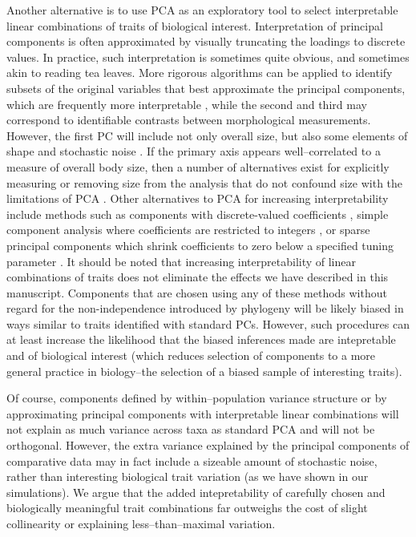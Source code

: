 \documentclass[a4paper,12pt]{article}
\begin{document}
Another alternative is to use PCA as an exploratory tool to select interpretable linear combinations of traits of biological interest. Interpretation of principal components is often approximated by visually truncating the loadings to discrete values. In practice, such interpretation is sometimes quite obvious, and sometimes akin to reading tea leaves. More rigorous algorithms can be applied to identify subsets of the original variables that best approximate the principal components, which are frequently more interpretable \citep{Cadima2001}, while the second and third may correspond to identifiable contrasts between morphological measurements. However, the first PC will include not only overall size, but also some elements of shape and stochastic noise \citep{Somers1986, Somers1989}. If the primary axis appears well--correlated to a measure of overall body size, then a number of alternatives exist for explicitly measuring or removing size from the analysis that do not confound size with the limitations of PCA \citep{Somers1989}. Other alternatives to PCA for increasing interpretability include methods such as components with discrete-valued coefficients \citep{Hausman1982}, simple component analysis where coefficients are restricted to integers \citep{Vines2000}, or sparse principal components which shrink coefficients to zero below a specified tuning parameter \citep{Jolliffe2002, Zou2006}. It should be noted that increasing interpretability of linear combinations of traits does not eliminate the effects we have described in this manuscript. Components that are chosen using any of these methods without regard for the non-independence introduced by phylogeny will be likely biased in ways similar to traits identified with standard PCs. However, such procedures can at least increase the likelihood that the biased inferences made are intepretable and of biological interest (which reduces selection of components to a more general practice in biology--the selection of a biased sample of interesting traits).  

Of course, components defined by within--population variance structure or by approximating principal components with interpretable linear combinations will not explain as much variance across taxa as standard PCA and will not be orthogonal. However, the extra variance explained by the principal components of comparative data may in fact include a sizeable amount of stochastic noise, rather than interesting biological trait variation (as we have shown in our simulations). We argue that the added intepretability of carefully chosen and biologically meaningful trait combinations far outweighs the cost of slight collinearity or explaining less--than--maximal variation.
\end{document}
